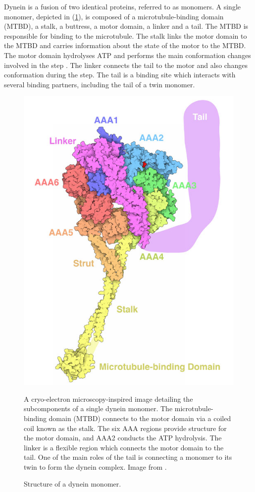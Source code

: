 \documentclass[
11pt, %
english, %
singlespacing, %
headsepline, %
chapterinoneline, %
]{MastersDoctoralThesis} %
\begin{document}
Dynein is a fusion of two identical proteins, referred to as monomers. A single monomer, depicted in (\ref{fig:pdb-motm-dynein}), is composed of a microtubule-binding domain (MTBD), a stalk, a buttress, a motor domain, a linker and a tail. The MTBD is responsible for binding to the microtubule. The stalk links the motor domain to the MTBD and carries information about the state of the motor to the MTBD. The motor domain hydrolyses ATP and performs the main conformation changes involved in the step \cite{FRETstatepaper}. The linker connects the tail to the motor and also changes conformation during the step. The tail is a binding site which interacts with several binding partners, including the tail of a twin monomer.\\

\begin{figure}[h]
  \centering
  \includegraphics[width=.5\textwidth,keepaspectratio]{../figures/pdb-motm-dynein}
  \caption{Structure of a dynein monomer.}{A cryo-electron microscopy-inspired image detailing the subcomponents of a single dynein monomer. The microtubule-binding domain (MTBD) connects to the motor domain via a coiled coil known as the stalk. The six AAA regions provide structure for the motor domain, and AAA2 conducts the ATP hydrolysis. The linker is a flexible region which connects the motor domain to the tail. One of the main roles of the tail is connecting a monomer to its twin to form the dynein complex. Image from \cite{pdb-motm-dynein}.}
  \label{fig:pdb-motm-dynein}
\end{figure}
\end{document}
